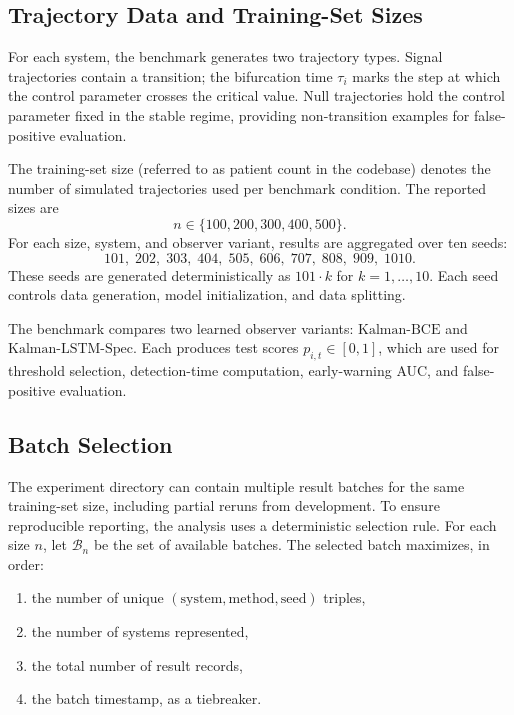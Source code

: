 \subsection{Trajectory Data and Training-Set Sizes}
\label{sec:data}

For each system, the benchmark generates two trajectory types. Signal
trajectories contain a transition; the bifurcation time \(\tau_i\) marks the
step at which the control parameter crosses the critical value. Null
trajectories hold the control parameter fixed in the stable regime, providing
non-transition examples for false-positive evaluation.

The training-set size (referred to as patient count in the codebase) denotes
the number of simulated trajectories used per benchmark condition. The
reported sizes are
\[
  n \in \{100, 200, 300, 400, 500\}.
\]
For each size, system, and observer variant, results are aggregated over ten
seeds:
\[
  101,\; 202,\; 303,\; 404,\; 505,\; 606,\; 707,\; 808,\; 909,\; 1010.
\]
These seeds are generated deterministically as \(101 \cdot k\) for
\(k = 1, \ldots, 10\). Each seed controls data generation, model
initialization, and data splitting.

The benchmark compares two learned observer variants:
\(\text{Kalman-BCE}\) and \(\text{Kalman-LSTM-Spec}\). Each produces test
scores \(p_{i,t} \in [0,1]\), which are used for threshold selection,
detection-time computation, early-warning AUC, and false-positive evaluation.

\subsection{Batch Selection}
\label{sec:batch}

The experiment directory can contain multiple result batches for the same
training-set size, including partial reruns from development. To ensure
reproducible reporting, the analysis uses a deterministic selection rule. For
each size \(n\), let \(\mathcal{B}_n\) be the set of available batches. The
selected batch maximizes, in order:

\begin{enumerate}[leftmargin=*]
  \item the number of unique \((\text{system}, \text{method}, \text{seed})\)
        triples,
  \item the number of systems represented,
  \item the total number of result records,
  \item the batch timestamp, as a tiebreaker.
\end{enumerate}

